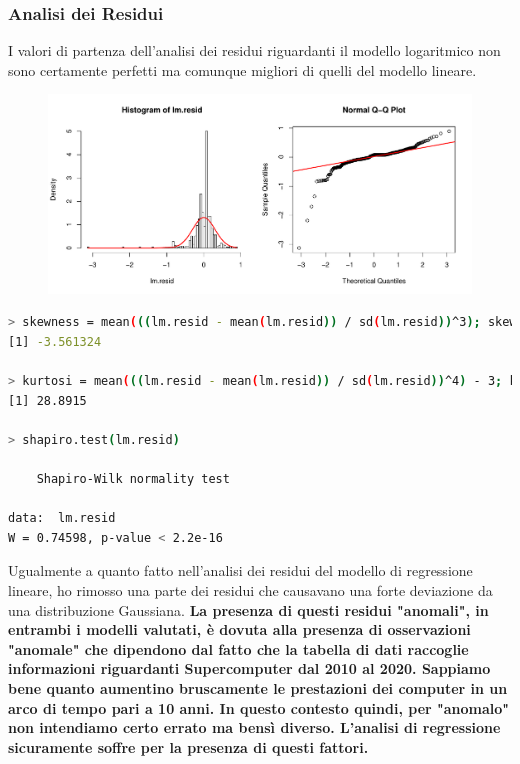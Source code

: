 \documentclass[11pt,a4paper]{article}
\begin{document}
\subsubsection{Analisi dei Residui}
I valori di partenza dell'analisi dei residui riguardanti il modello
logaritmico non sono certamente perfetti ma comunque migliori di quelli del
modello lineare.
\begin{figure}[H]
	\hspace{-1.5cm}
	\includegraphics[scale=0.7]{imgs/residuals_log.pdf}
\end{figure}
\vspace{-0.8cm}
\begin{lstlisting}[language=bash,basicstyle=\tiny,tabsize=2,frame = single]
> skewness = mean(((lm.resid - mean(lm.resid)) / sd(lm.resid))^3); skewness
[1] -3.561324

> kurtosi = mean(((lm.resid - mean(lm.resid)) / sd(lm.resid))^4) - 3; kurtosi
[1] 28.8915

> shapiro.test(lm.resid)

	Shapiro-Wilk normality test

data:  lm.resid
W = 0.74598, p-value < 2.2e-16
\end{lstlisting}
Ugualmente a quanto fatto nell'analisi dei residui del modello di regressione
lineare, ho rimosso una parte dei residui che causavano una forte deviazione da
una distribuzione Gaussiana. \textbf{La presenza di questi residui "anomali", in
entrambi i modelli valutati, \`e dovuta alla presenza di osservazioni "anomale"
che dipendono dal fatto che la tabella di dati raccoglie informazioni
riguardanti Supercomputer dal 2010 al 2020. Sappiamo bene quanto aumentino
bruscamente le prestazioni dei computer in un arco di tempo pari a 10 anni. In
questo contesto quindi, per "anomalo" non intendiamo certo errato ma bens\`i
diverso. L'analisi di regressione sicuramente soffre per la presenza di questi
fattori.}
\end{document}
